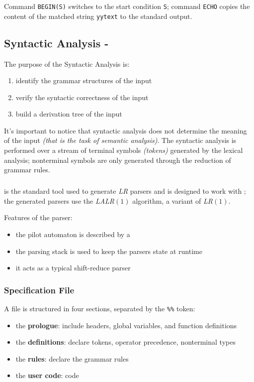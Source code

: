 \documentclass[english]{article}
\begin{document}
Command \texttt{BEGIN(S)} switches to the start condition \texttt{S};
command \texttt{ECHO} copies the content of the matched string \texttt{yytext} to the standard output.

\subsection{Syntactic Analysis - \bison}

The purpose of the Syntactic Analysis is:

\begin{enumerate}
  \item identify the grammar structures of the input
  \item verify the syntactic correctness of the input
  \item build a derivation tree of the input
\end{enumerate}

It's important to notice that syntactic analysis does not determine the meaning of the input \textit{(that is the task of semantic analysis)}.
The syntactic analysis is performed over a stream of terminal symbols \textit{(tokens)} generated by the lexical analysis;
nonterminal symbols are only generated through the reduction of grammar rules.

\subparagraph*{\bison}

\bison is the standard tool used to generate \textit{LR} parsers and is designed to work with \flex;
the generated parsers use the \textit{LALR\((1)\)} algorithm, a variant of \textit{LR\((1)\)}.

Features of the parser:

\begin{itemize}
  \item the pilot automaton is described by a \FSA
  \item the parsing stack is used to keep the parsers state at runtime
  \item it acts as a typical shift-reduce parser
\end{itemize}

\subsubsection{Specification File}

A \bison file is structured in four sections, separated by the \texttt{\%\%} token:

\begin{itemize}
  \item the \textbf{prologue}: include headers, global variables, and function definitions
  \item the \textbf{definitions}: declare tokens, operator precedence, nonterminal types
  \item the \textbf{rules}: declare the grammar rules
  \item the \textbf{user code}: \clang code
\end{itemize}
\end{document}
